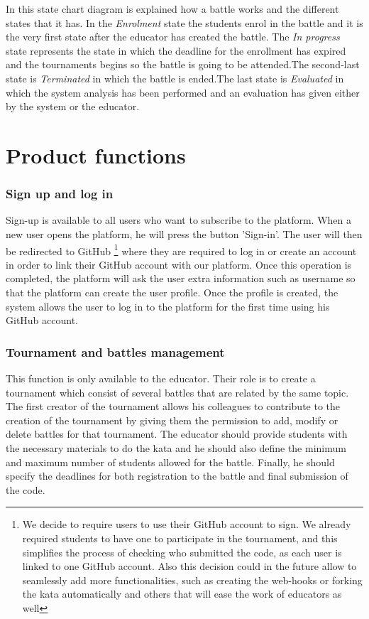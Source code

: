 In this state chart diagram is explained how a battle works and the different states that it has. In the\textit{ Enrolment} state the students enrol in the battle and it is the very first state after the educator has created the battle.
The \textit{In progress} state represents the state in which the deadline for the enrollment has expired and the tournaments begins so the battle is going to be attended.The second-last state is \textit{Terminated} in which the battle is ended.The last state is  \textit{Evaluated} in which the system analysis has been performed and an evaluation has given either by the system or the educator.

\section{Product functions}
\subsubsection{Sign up and log in}
Sign-up is available to all users who want to subscribe to the platform. When a new user opens the platform, he will press the button 'Sign-in'. The user will then be redirected to GitHub \footnote{We decide to require users to use their GitHub account to sign. We already required students to have one to participate in the tournament, and this simplifies the process of checking who submitted the code, as each user is linked to one GitHub account. Also this decision could in the future allow to seamlessly add more functionalities,  such as creating the web-hooks or forking the kata automatically and others that will ease the work of educators as well} where they are required to log in or create an account in order to link their GitHub account with our platform. Once this operation is completed, the platform will ask the user extra information such as username so that the platform can create the user profile. Once the profile is created, the system allows the user to log in to the platform for the first time using his GitHub account.\cite{githubOAuth}

\subsubsection{Tournament and battles management}
This function is only available to the educator. Their role is to create a tournament which consist of several battles that are related by the same topic. The first creator of the tournament allows his colleagues to contribute to the creation of the tournament by giving them the permission to add, modify or delete battles for that tournament.
The educator should provide students with the necessary materials to do the kata and he should also define the minimum and maximum number of students allowed for the battle. Finally, he should specify the deadlines for both registration to the battle and final submission of the code.

